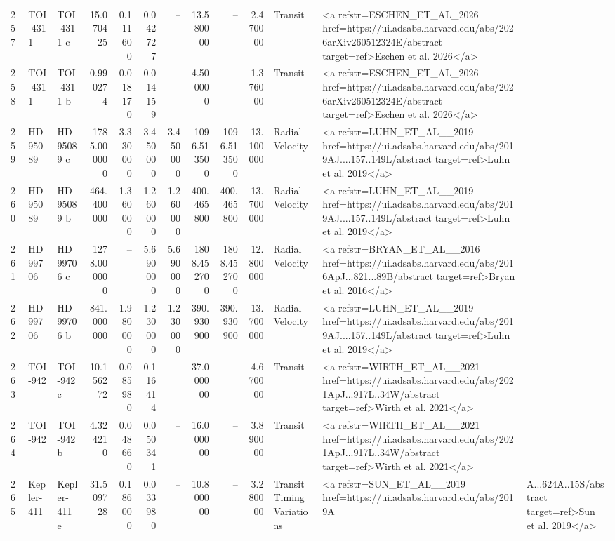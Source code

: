 \begin{tabular}{lllrrrrrrrll}
257 & TOI-4311 & TOI-4311 c & 15.070425 & 0.111600 & 0.042727 & -- & 13.580000 & -- & 2.470000 & Transit & <a refstr=ESCHEN_ET_AL_2026 href=https://ui.adsabs.harvard.edu/abs/2026arXiv260512324E/abstract target=ref>Eschen et al. 2026</a> \\
258 & TOI-4311 & TOI-4311 b & 0.990274 & 0.018170 & 0.014159 & -- & 4.500000 & -- & 1.376000 & Transit & <a refstr=ESCHEN_ET_AL_2026 href=https://ui.adsabs.harvard.edu/abs/2026arXiv260512324E/abstract target=ref>Eschen et al. 2026</a> \\
259 & HD 95089 & HD 95089 c & 1785.000000 & 3.330000 & 3.450000 & 3.450000 & 1096.513500 & 1096.513500 & 13.100000 & Radial Velocity & <a refstr=LUHN_ET_AL__2019 href=https://ui.adsabs.harvard.edu/abs/2019AJ....157..149L/abstract target=ref>Luhn et al. 2019</a> \\
260 & HD 95089 & HD 95089 b & 464.400000 & 1.360000 & 1.260000 & 1.260000 & 400.465800 & 400.465800 & 13.700000 & Radial Velocity & <a refstr=LUHN_ET_AL__2019 href=https://ui.adsabs.harvard.edu/abs/2019AJ....157..149L/abstract target=ref>Luhn et al. 2019</a> \\
261 & HD 99706 & HD 99706 c & 1278.000000 & -- & 5.690000 & 5.690000 & 1808.452700 & 1808.452700 & 12.800000 & Radial Velocity & <a refstr=BRYAN_ET_AL__2016 href=https://ui.adsabs.harvard.edu/abs/2016ApJ...821...89B/abstract target=ref>Bryan et al. 2016</a> \\
262 & HD 99706 & HD 99706 b & 841.000000 & 1.980000 & 1.230000 & 1.230000 & 390.930900 & 390.930900 & 13.700000 & Radial Velocity & <a refstr=LUHN_ET_AL__2019 href=https://ui.adsabs.harvard.edu/abs/2019AJ....157..149L/abstract target=ref>Luhn et al. 2019</a> \\
263 & TOI-942 & TOI-942 c & 10.156272 & 0.085980 & 0.116414 & -- & 37.000000 & -- & 4.670000 & Transit & <a refstr=WIRTH_ET_AL__2021 href=https://ui.adsabs.harvard.edu/abs/2021ApJ...917L..34W/abstract target=ref>Wirth et al. 2021</a> \\
264 & TOI-942 & TOI-942 b & 4.324210 & 0.048660 & 0.050341 & -- & 16.000000 & -- & 3.890000 & Transit & <a refstr=WIRTH_ET_AL__2021 href=https://ui.adsabs.harvard.edu/abs/2021ApJ...917L..34W/abstract target=ref>Wirth et al. 2021</a> \\
265 & Kepler-411 & Kepler-411 e & 31.509728 & 0.186000 & 0.033980 & -- & 10.800000 & -- & 3.280000 & Transit Timing Variations & <a refstr=SUN_ET_AL__2019 href=https://ui.adsabs.harvard.edu/abs/2019A&A...624A..15S/abstract target=ref>Sun et al. 2019</a> \\

\end{tabular}
